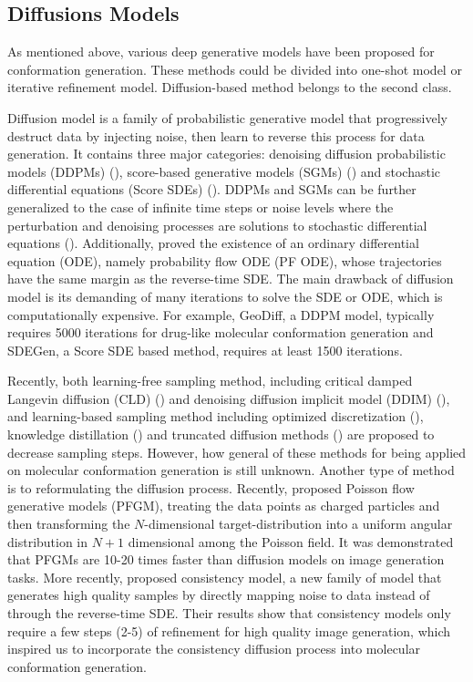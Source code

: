 \documentclass{article} %
\begin{document}
\subsection{Diffusions Models}
As mentioned above, various deep generative models have been proposed for conformation generation. These methods could be divided into one-shot model or iterative refinement model. Diffusion-based method belongs to the second class. 

Diffusion model is a family of probabilistic generative model that progressively destruct data by injecting noise, then learn to reverse this process for data generation. It contains three major categories: denoising diffusion probabilistic models (DDPMs) (\cite{ho2020denoising}), score-based generative models (SGMs) (\cite{song2019generative}) and stochastic differential equations (Score SDEs) (\cite{song2020score}). DDPMs and SGMs can be further generalized to the case of infinite time steps or noise levels where the perturbation and denoising processes are solutions to stochastic differential equations (\cite{yang2022diffusion}). Additionally, \cite{song2020score} proved the existence of an ordinary differential equation (ODE), namely probability flow ODE (PF ODE), whose trajectories have the same margin as the reverse-time SDE. The main drawback of diffusion model is its demanding of many iterations to solve the SDE or ODE, which is computationally expensive. For example, GeoDiff, a DDPM model, typically requires 5000 iterations for drug-like molecular conformation generation and SDEGen, a Score SDE based method, requires at least 1500 iterations.

Recently, both learning-free sampling method, including critical damped Langevin diffusion (CLD) (\cite{dockhorn2021score}) and denoising diffusion implicit model (DDIM) (\cite{song2020denoising}), and learning-based sampling method including optimized discretization (\cite{watson2021learning}), knowledge distillation (\cite{salimans2022progressive}) and truncated diffusion methods (\cite{lyu2022accelerating}) are proposed to decrease sampling steps. However, how general of these methods for being applied on molecular conformation generation is still unknown. Another type of method is to reformulating the diffusion process. Recently, \cite{xu2022poisson} proposed Poisson flow generative models (PFGM), treating the data points as charged particles and then transforming the $N$-dimensional target-distribution into a uniform angular distribution in $N+1$ dimensional among the Poisson field. It was demonstrated that PFGMs are 10-20 times faster than diffusion models on image generation tasks. More recently, \cite{song2023consistency} proposed consistency model, a new family of model that generates high quality samples by directly mapping noise to data instead of through the reverse-time SDE. Their results show that consistency models only require a few steps (2-5) of refinement for high quality image generation, which inspired us to incorporate the consistency diffusion process into molecular conformation generation. 
\end{document}
